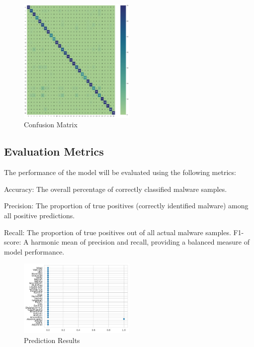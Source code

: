 \documentclass[conference]{IEEEtran}
\begin{document}
\begin{figure}[ht] %
  \centering %
  \includegraphics[width=0.5\textwidth]{confusionmatrixf.jpeg} %
  \caption{Confusion Matrix} %
  \label{fig:example6} %
\end{figure}

\subsection{Evaluation Metrics}
The performance of the model will be evaluated using the following metrics:

    Accuracy: The overall percentage of correctly classified malware samples.
    
    Precision: The proportion of true positives (correctly identified malware) among all positive predictions.
    
    Recall: The proportion of true positives out of all actual malware samples.
    F1-score: A harmonic mean of precision and recall, providing a balanced measure of model performance.





\begin{figure}[ht] %
  \centering %
  \includegraphics[width=0.5\textwidth]{PredictionResults.jpeg} %
  \caption{Prediction Results } %
  \label{fig:example7} %
\end{figure}
\end{document}
